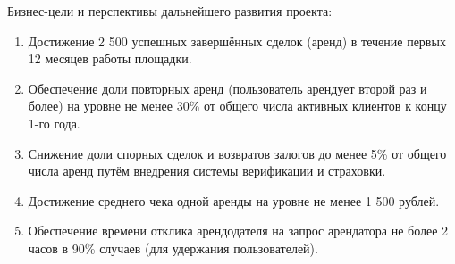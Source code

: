 Бизнес-цели и перспективы дальнейшего развития проекта:
\begin{enumerate}
	\item Достижение 2 500 успешных завершённых сделок (аренд) в течение первых 12 месяцев работы площадки.
	
	\item Обеспечение доли повторных аренд (пользователь арендует второй раз и более) на уровне не менее 30\% от общего числа активных клиентов к концу 1-го года.
	
	\item Снижение доли спорных сделок и возвратов залогов до менее 5\% от общего числа аренд путём внедрения системы верификации и страховки.
	
	\item Достижение среднего чека одной аренды на уровне не менее 1 500 рублей.
	
	\item Обеспечение времени отклика арендодателя на запрос арендатора не более 2 часов в 90\% случаев (для удержания пользователей).
\end{enumerate}